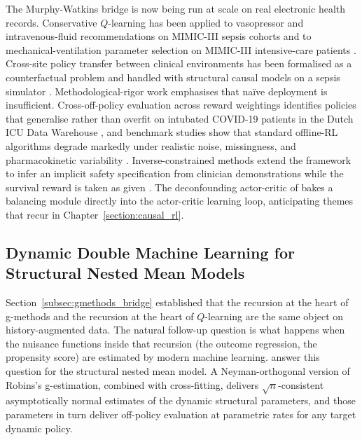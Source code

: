 The Murphy-Watkins bridge is now being run at scale on real electronic health records. Conservative $Q$-learning has been applied to vasopressor and intravenous-fluid recommendations on MIMIC-III sepsis cohorts \citep{kaushik2022sepsiscql} and to mechanical-ventilation parameter selection on MIMIC-III intensive-care patients \citep{kondrup2023deepvent}. Cross-site policy transfer between clinical environments has been formalised as a counterfactual problem and handled with structural causal models on a sepsis simulator \citep{killian2022cftransfer}. Methodological-rigor work emphasises that na\"ive deployment is insufficient. Cross-off-policy evaluation across reward weightings identifies policies that generalise rather than overfit on intubated COVID-19 patients in the Dutch ICU Data Warehouse \citep{roggeveen2024icmrl}, and benchmark studies show that standard offline-RL algorithms degrade markedly under realistic noise, missingness, and pharmacokinetic variability \citep{luo2024dtrbench}. Inverse-constrained methods extend the framework to infer an implicit safety specification from clinician demonstrations while the survival reward is taken as given \citep{liu2024oicrl}. The deconfounding actor-critic of \citet{yin2022deconfoundingac} bakes a balancing module directly into the actor-critic learning loop, anticipating themes that recur in Chapter~\ref{section:causal_rl}.

\subsection{Dynamic Double Machine Learning for Structural Nested Mean Models}
\label{subsec:dml_dte}

Section~\ref{subsec:gmethods_bridge} established that the recursion at the heart of g-methods and the recursion at the heart of $Q$-learning are the same object on history-augmented data. The natural follow-up question is what happens when the nuisance functions inside that recursion (the outcome regression, the propensity score) are estimated by modern machine learning. \citet{lewisSyrgkanis2021dynamicDML} answer this question for the structural nested mean model. A Neyman-orthogonal version of Robins's g-estimation, combined with cross-fitting, delivers $\sqrt n$-consistent asymptotically normal estimates of the dynamic structural parameters, and those parameters in turn deliver off-policy evaluation at parametric rates for any target dynamic policy.

